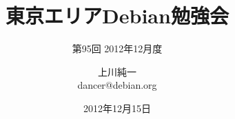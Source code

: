 




\documentclass[cjk,dvipdfmx,12pt]{beamer}
\usepackage{monthlypresentation}



\title{東京エリアDebian勉強会}
\subtitle{第95回 2012年12月度}
\author{上川純一\\dancer@debian.org}
\date{2012年12月15日}



